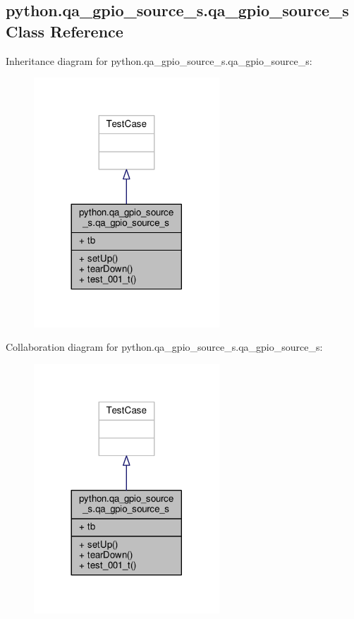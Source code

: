 \subsection{python.\+qa\+\_\+gpio\+\_\+source\+\_\+s.\+qa\+\_\+gpio\+\_\+source\+\_\+s Class Reference}
\label{classpython_1_1qa__gpio__source__s_1_1qa__gpio__source__s}


Inheritance diagram for python.\+qa\+\_\+gpio\+\_\+source\+\_\+s.\+qa\+\_\+gpio\+\_\+source\+\_\+s\+:
\nopagebreak
\begin{figure}[H]
\begin{center}
\leavevmode
\includegraphics[width=197pt]{d6/d7b/classpython_1_1qa__gpio__source__s_1_1qa__gpio__source__s__inherit__graph}
\end{center}
\end{figure}


Collaboration diagram for python.\+qa\+\_\+gpio\+\_\+source\+\_\+s.\+qa\+\_\+gpio\+\_\+source\+\_\+s\+:
\nopagebreak
\begin{figure}[H]
\begin{center}
\leavevmode
\includegraphics[width=197pt]{d3/d72/classpython_1_1qa__gpio__source__s_1_1qa__gpio__source__s__coll__graph}
\end{center}
\end{figure}
